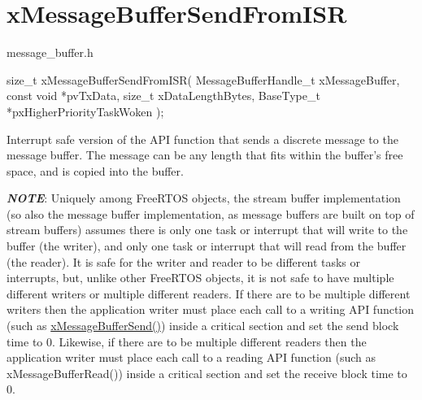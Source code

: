 \hypertarget{group__xMessageBufferSendFromISR}{}\section{x\+Message\+Buffer\+Send\+From\+I\+SR}
\label{group__xMessageBufferSendFromISR}
message\+\_\+buffer.\+h


\begin{DoxyPre}
size\_t xMessageBufferSendFromISR( MessageBufferHandle\_t xMessageBuffer,
                                  const void *pvTxData,
                                  size\_t xDataLengthBytes,
                                  BaseType\_t *pxHigherPriorityTaskWoken );

\begin{DoxyPre}\end{DoxyPre}
\end{DoxyPre}



\begin{DoxyPre}
\begin{DoxyPre}   Interrupt safe version of the API function that sends a discrete message to
   the message buffer.  The message can be any length that fits within the
   buffer's free space, and is copied into the buffer.\end{DoxyPre}
\end{DoxyPre}



\begin{DoxyPre}
\begin{DoxyPre}   {\itshape {\bfseries NOTE}}:  Uniquely among FreeRTOS objects, the stream buffer
   implementation (so also the message buffer implementation, as message buffers
   are built on top of stream buffers) assumes there is only one task or
   interrupt that will write to the buffer (the writer), and only one task or
   interrupt that will read from the buffer (the reader).  It is safe for the
   writer and reader to be different tasks or interrupts, but, unlike other
   FreeRTOS objects, it is not safe to have multiple different writers or
   multiple different readers.  If there are to be multiple different writers
   then the application writer must place each call to a writing API function
   (such as \hyperlink{message__buffer_8h_a858f6da6fe24a226c45caf1634ea1605}{xMessageBufferSend()}) inside a critical section and set the send
   block time to 0.  Likewise, if there are to be multiple different readers
   then the application writer must place each call to a reading API function
   (such as xMessageBufferRead()) inside a critical section and set the receive
   block time to 0.\end{DoxyPre}
\end{DoxyPre}



